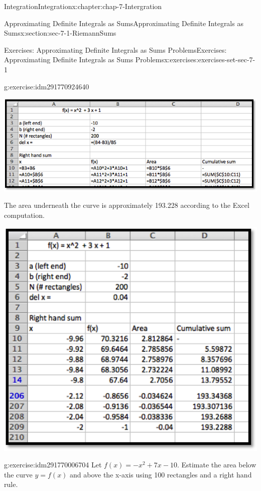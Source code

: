 \documentclass[oneside,10pt,]{book}
\numberwithin{equation}{section}
\begin{document}
\begin{chapterptx}{Integration}{}{Integration}{}{}{x:chapter:chap-7-Intergration}
\begin{sectionptx}{Approximating Definite Integrals as Sums}{}{Approximating Definite Integrals as Sums}{}{}{x:section:sec-7-1-RiemannSums}
\begin{exercises-subsection}{Exercises: Approximating Definite Integrals as Sums Problems}{}{Exercises: Approximating Definite Integrals as Sums Problems}{}{}{x:exercises:exercises-set-sec-7-1}
\begin{divisionexercise}{3}{}{}{g:exercise:idm291770924640}
\begin{sidebyside}{1}{0}{0}{0}
\begin{sbspanel}{1}%
\includegraphics[width=\linewidth]{images/sec7-1-sol3a.png}
\end{sbspanel}%
\end{sidebyside}%
\par
The area underneath the curve is approximately 193.228 according to the Excel computation.%
\begin{sidebyside}{1}{0.2}{0.2}{0}%
\begin{sbspanel}{0.6}%
\includegraphics[width=\linewidth]{images/sec7-1-sol3b.png}
\end{sbspanel}%
\end{sidebyside}%
\end{divisionexercise}%
\begin{divisionexercise}{4}{}{}{g:exercise:idm291770006704}%
Let \(f(x) = -x^2  + 7 x - 10\).  Estimate the area below the curve \(y =  f(x)\) and above the x-axis using 100 rectangles and a right hand rule.%
\end{divisionexercise}%

\end{exercises-subsection}
\end{sectionptx}
\end{chapterptx}
\end{document}
